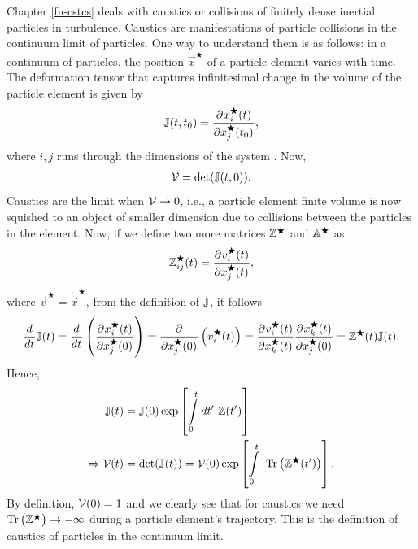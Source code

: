 \documentclass[../Rajarshi-thesis-draft.tex]{subfiles}
\begin{document}
Chapter \ref{fn-cstcs} deals with caustics or collisions of finitely dense inertial particles in turbulence. Caustics are manifestations of particle collisions in the continuum limit of particles. One way to understand them is as follows: in a continuum of particles, the position $\vec{x}^\bigstar$ of a particle element varies with time. The deformation tensor that captures infinitesimal change in the volume of the particle element is given by 
\begin{align}
\begin{split}
\mathbb{J}(t,t_0) = \frac{\partial^{} x_i^\bigstar(t)}{\partial x_j^\bigstar(t_0)^{}},
\end{split}
\end{align}
where $i,j$ runs through the dimensions of the system . Now, 
\begin{align}
\begin{split}
\mathcal{V} = \det(\mathbb{J}(t, 0)).
\end{split}
\end{align}
Caustics are the limit when $\mathcal{V} \to 0$, i.e., a particle element  finite volume is now squished to an object of smaller dimension due to collisions between the particles in the element. Now, if we define two more matrices $\mathbb{Z}^\bigstar$ and $\mathbb{A}^\bigstar$ as
\begin{align}
\label{og_ZA}
\begin{split}
\mathbb{Z}_{ij}^\bigstar(t) = \frac{\partial^{} v_i^\bigstar(t)}{\partial x_j^\bigstar(t)^{}},
\end{split}
\end{align}
where $\vec{v}^\bigstar = \dot{\vec{x}}^\bigstar$, from the definition of $\mathbb{J}$, it follows 
\begin{align}
\begin{split}
\frac{d^{} }{d t^{}}\mathbb{J}(t) = \frac{d^{} }{d t^{}} \left( \frac{\partial^{} x_i^\bigstar(t)}{\partial x_j^\bigstar(0)^{}} \right) = \frac{\partial^{} }{\partial x_j^\bigstar(0)^{}} \left( v_i^\bigstar(t)\right)  = \frac{\partial^{} v_i^\bigstar(t)}{\partial x_k^\bigstar(t)^{}} \frac{\partial^{} x_k^\bigstar(t)}{\partial x_j^\bigstar(0)^{}} = \mathbb{Z^\bigstar}(t)\mathbb{J}(t).
\end{split}
\end{align}
Hence, 
\begin{align}
\begin{split}
\mathbb{J}(t) &= \mathbb{J}(0)\exp\left[ \int\limits_{0}^{t}dt'\ \mathbb{Z}(t') \right] \\
\Rightarrow\mathcal{V}(t) &= \det(\mathbb{J}(t)) = \mathcal{V}(0) \exp \left[ \int\limits_{0}^{t}\ \operatorname{Tr}\big(\mathbb{Z}^\bigstar(t')\big) \right].
\end{split}
\end{align}
By definition, $\mathcal{V}(0) = 1$ and we clearly see that for caustics we need $\operatorname{Tr}\big(\mathbb{Z}^\bigstar\big) \to -\infty$ during a particle element's trajectory. This is the definition of caustics of particles in the continuum limit.
\end{document}
